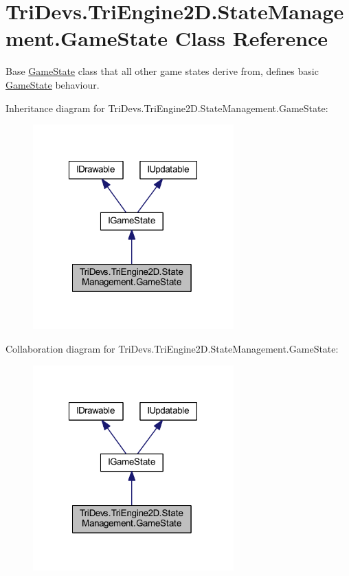 \hypertarget{class_tri_devs_1_1_tri_engine2_d_1_1_state_management_1_1_game_state}{\section{Tri\-Devs.\-Tri\-Engine2\-D.\-State\-Management.\-Game\-State Class Reference}
\label{class_tri_devs_1_1_tri_engine2_d_1_1_state_management_1_1_game_state}
}


Base \hyperlink{class_tri_devs_1_1_tri_engine2_d_1_1_state_management_1_1_game_state}{Game\-State} class that all other game states derive from, defines basic \hyperlink{class_tri_devs_1_1_tri_engine2_d_1_1_state_management_1_1_game_state}{Game\-State} behaviour.  




Inheritance diagram for Tri\-Devs.\-Tri\-Engine2\-D.\-State\-Management.\-Game\-State\-:\nopagebreak
\begin{figure}[H]
\begin{center}
\leavevmode
\includegraphics[width=219pt]{class_tri_devs_1_1_tri_engine2_d_1_1_state_management_1_1_game_state__inherit__graph}
\end{center}
\end{figure}


Collaboration diagram for Tri\-Devs.\-Tri\-Engine2\-D.\-State\-Management.\-Game\-State\-:\nopagebreak
\begin{figure}[H]
\begin{center}
\leavevmode
\includegraphics[width=219pt]{class_tri_devs_1_1_tri_engine2_d_1_1_state_management_1_1_game_state__coll__graph}
\end{center}
\end{figure}

